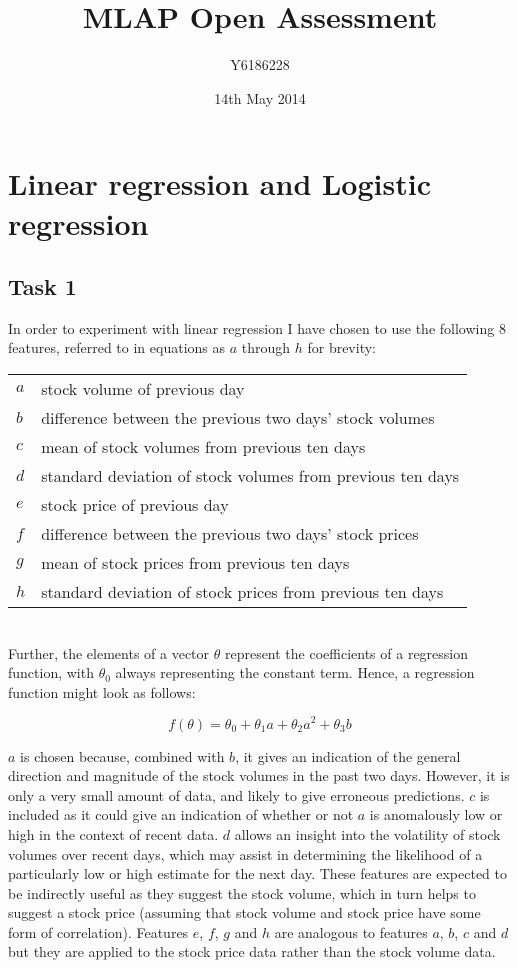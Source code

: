 \documentclass[a4paper,11pt]{article}
\title{MLAP Open Assessment}
\author{Y6186228}
\date{14th May 2014}
\newcommand*{\foc}[3]{f(\theta) = \theta_0 + \theta_1 {#1} + \theta_2 {#2} + \theta_3 {#3}}
\begin{document}
\maketitle

\section{Linear regression and Logistic regression}
\label{s1}
\subsection{Task 1}
\label{s11}
In order to experiment with linear regression I have chosen to use the following 8 features, referred to in equations as $a$ through $h$ for brevity:\\

\begin{tabular}{l l}
	$a$	& stock volume of previous day \\
	$b$	& difference between the previous two days' stock volumes \\
	$c$	& mean of stock volumes from previous ten days \\
	$d$	& standard deviation of stock volumes from previous ten days \\
	$e$	& stock price of previous day \\
	$f$	& difference between the previous two days' stock prices \\
	$g$	& mean of stock prices from previous ten days \\
	$h$	& standard deviation of stock prices from previous ten days
\end{tabular}\\

Further, the elements of a vector $\theta$ represent the coefficients of a regression function, with $\theta_0$ always representing the constant term.  Hence, a regression function might look as follows:

\[ \foc{a}{a^2}{b} \]

$a$ is chosen because, combined with $b$, it gives an indication of the general direction and magnitude of the stock volumes in the past two days.  However, it is only a very small amount of data, and likely to give erroneous predictions.  $c$ is included as it could give an indication of whether or not $a$ is anomalously low or high in the context of recent data.  $d$ allows an insight into the volatility of stock volumes over recent days, which may assist in determining the likelihood of a particularly low or high estimate for the next day.  These features are expected to be indirectly useful as they suggest the stock volume, which in turn helps to suggest a stock price (assuming that stock volume and stock price have some form of correlation).  Features $e$, $f$, $g$ and $h$ are analogous to features $a$, $b$, $c$ and $d$ but they are applied to the stock price data rather than the stock volume data.
\end{document}
